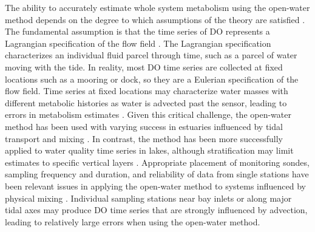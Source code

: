 \documentclass[letterpaper,12pt,oneside]{article}\usepackage[]{graphicx}\usepackage[]{color}
\begin{document}
The ability to accurately estimate whole system metabolism using the open-water method depends on the degree to which assumptions of the theory are satisfied \citep{Staehr10,Kemp12}.  The fundamental assumption is that the time series of \ac{DO} represents a Lagrangian specification of the flow field \citep{Needoba12}.  The Lagrangian specification characterizes an individual fluid parcel through time, such as a parcel of water moving with the tide.  In reality, most \ac{DO} time series are collected at fixed locations such as a mooring or dock, so they are a Eulerian specification of the flow field.  Time series at fixed locations may characterize water masses with different metabolic histories as water is advected past the sensor, leading to errors in metabolism estimates \citep{Kemp80,Russell07}.  Given this critical challenge, the open-water method has been used with varying success in estuaries influenced by tidal transport and mixing \citep{Caffrey04,Russell07,Caffrey14}.  In contrast, the method has been more successfully applied to water quality time series in lakes, although stratification may limit estimates to specific vertical layers \citep{Staehr10,Coloso11,Batt12}. Appropriate placement of monitoring sondes, sampling frequency and duration, and reliability of data from single stations have been relevant issues in applying the open-water method to systems influenced by physical mixing \citep{Russell07,Staehr10}.  Individual sampling stations near bay inlets or along major tidal axes may produce \ac{DO} time series that are strongly influenced by advection, leading to relatively large errors when using the open-water method.   
\end{document}
